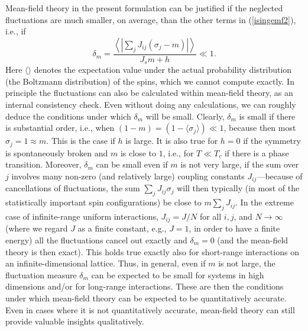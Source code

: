 \documentclass[draft,numberedheadings]{aipproc}
\begin{document}
Mean-field theory in the present formulation can be justified if the neglected fluctuations are much smaller, on average, than the other terms in 
(\ref{isingemf2}), i.e., if
\begin{equation}
\delta_m =\frac{\left \langle \left | \sum_j J_{ij}(\sigma_j - m) \right | \right \rangle }{J_sm + h} \ll 1.
\end{equation}
Here $\langle \rangle$ denotes the expectation value under the actual probability distribution (the Boltzmann distribution) of the spins, which we cannot 
compute exactly. In principle the fluctuations can also be calculated within mean-field theory, as an internal consistency check. Even without doing any 
calculations, we can  roughly deduce the conditions under which $\delta_m$ will be small. Clearly, $\delta_m$ is small if there is substantial order, i.e., when 
$(1-m)=(1-\langle \sigma_j\rangle) \ll 1$, because then most $\sigma_j=1 \approx m$. This is the case if $h$ is large. It is also true for $h=0$ if the symmetry 
is spontaneously broken and $m$ is close to $1$, i.e., for $T \ll T_c$ if there is a phase transition. Moreover, $\delta_m$ can be small even if $m$ is not very 
large, if the sum over $j$ involves many non-zero (and relatively large) coupling constants $J_{ij}$---because of cancellations of fluctuations, the sum 
$\sum_j J_{ij} \sigma_j$ will then typically (in most of the statistically important spin configurations) be close to $m\sum_j J_{ij}$. In the extreme case of 
infinite-range uniform interactions, $J_{ij}=J/N$ for all $i,j$, and $N \to \infty$ (where we regard $J$ as a finite constant, e.g., $J=1$, in order to have a 
finite energy) all the fluctuations cancel out exactly and $\delta_m=0$ (and the mean-field theory is then exact). This holds true exactly also for short-range 
interactions on an infinite-dimensional lattice. Thus, in general, even if $m$ is not large, the fluctuation measure $\delta_m$ can be expected to be small for 
systems in high dimensions and/or for long-range interactions. These are then the conditions under which mean-field theory can be expected to be quantitatively 
accurate. Even in cases where it is not quantitatively accurate, mean-field theory can still provide valuable insights qualitatively.
\end{document}
